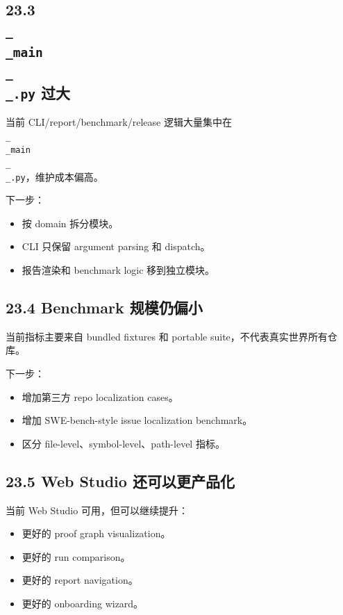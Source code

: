 \documentclass[UTF8,12pt,openany]{ctexbook}
\begin{document}
\subsection{23.3 \texttt{\\_\\_main\\_\\_.py} 过大}

当前 CLI/report/benchmark/release 逻辑大量集中在 \texttt{\\_\\_main\\_\\_.py}，维护成本偏高。\par

下一步：\par

\begin{itemize}
\item 按 domain 拆分模块。
\item CLI 只保留 argument parsing 和 dispatch。
\item 报告渲染和 benchmark logic 移到独立模块。
\end{itemize}

\subsection{23.4 Benchmark 规模仍偏小}

当前指标主要来自 bundled fixtures 和 portable suite，不代表真实世界所有仓库。\par

下一步：\par

\begin{itemize}
\item 增加第三方 repo localization cases。
\item 增加 SWE-bench-style issue localization benchmark。
\item 区分 file-level、symbol-level、path-level 指标。
\end{itemize}

\subsection{23.5 Web Studio 还可以更产品化}

当前 Web Studio 可用，但可以继续提升：\par

\begin{itemize}
\item 更好的 proof graph visualization。
\item 更好的 run comparison。
\item 更好的 report navigation。
\item 更好的 onboarding wizard。
\end{itemize}
\end{document}
